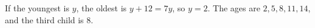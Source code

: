 If the youngest is $y$, the oldest is $y+12=7y$, so $y=2$. The ages are $2,5,8,11,14$, and the third child is $\boxed{8}$.
